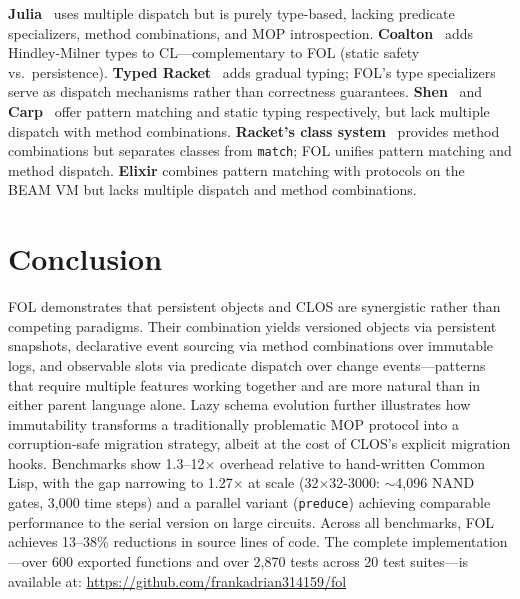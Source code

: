 \documentclass[sigconf,nonacm,review]{acmart}
\begin{document}
\textbf{Julia}~\cite{Bezanson2017} uses multiple dispatch but is purely type-based, lacking predicate specializers, method combinations, and MOP introspection. \textbf{Coalton}~\cite{Smith2023} adds Hindley-Milner types to CL---complementary to FOL (static safety vs.\ persistence). \textbf{Typed Racket}~\cite{TobinHochstadt2008} adds gradual typing; FOL's type specializers serve as dispatch mechanisms rather than correctness guarantees. \textbf{Shen}~\cite{Tarver2011} and \textbf{Carp}~\cite{Svedang2018} offer pattern matching and static typing respectively, but lack multiple dispatch with method combinations. \textbf{Racket's class system}~\cite{Flatt2006} provides method combinations but separates classes from \texttt{match}; FOL unifies pattern matching and method dispatch. \textbf{Elixir} combines pattern matching with protocols on the BEAM VM but lacks multiple dispatch and method combinations.

\section{Conclusion}

FOL demonstrates that persistent objects and CLOS are synergistic rather than competing paradigms. Their combination yields versioned objects via persistent snapshots, declarative event sourcing via method combinations over immutable logs, and observable slots via predicate dispatch over change events---patterns that require multiple features working together and are more natural than in either parent language alone. Lazy schema evolution further illustrates how immutability transforms a traditionally problematic MOP protocol into a corruption-safe migration strategy, albeit at the cost of CLOS's explicit migration hooks. Benchmarks show 1.3--12$\times$ overhead relative to hand-written Common Lisp, with the gap narrowing to 1.27$\times$ at scale (32$\times$32-3000: $\sim$4{,}096 NAND gates, 3{,}000 time steps) and a parallel variant (\texttt{preduce}) achieving comparable performance to the serial version on large circuits. Across all benchmarks, FOL achieves 13--38\% reductions in source lines of code. The complete implementation---over 600 exported functions and over 2,870 tests across 20 test suites---is available at:
\url{https://github.com/frankadrian314159/fol}

\balance


\end{document}
